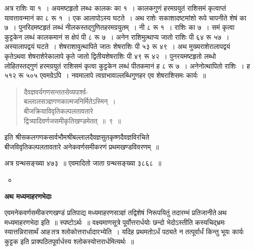 \documentclass[11pt, openany]{book}
\begin{document}
 अत्र राशिः या १~। अयमष्टहृतो लब्धः कालकः का १~। कालकगुणं हरमग्रयुतं राशिसमं कृत्वाप्तं यावत्तावन्मानं का ८ रू १~। एक आलापोऽस्य घटते~। अथ राशेः सकाशादष्टमांशो रूपे चापनीते शेषं का ७~। पुनरिदमष्टहृतं लब्धं नीलकस्तद्गुणितहरमग्रयुतम्~। नी ८ 
रू १~। राशिः का ७~। समं कृत्वा कुट्टकेन लब्धं कालकमानं स क्षेपं 
पी ८ रू ७~। अनेन राशिमुत्थाप्य जातो राशिः पी ६४ रू ५७~। 
अस्यालापद्वयं घटते~। शेषराशावुत्थापिते जातः शेषराशिः पी ५३ 
रू ४९~। अथ मुख्यराशेरालापद्वयं कृतेऽथवा शेषराशेरेकालापे कृते जातो 
द्वितीयशेषराशिः पी ४९ रू ४२~। पुनरयमष्टहृतो लब्धो लोहितस्तद्गुणं 
हरमग्रयुतं राशिसमं कृत्वा कुट्टकेन लब्धं पीतकमानं ह ८ रू ७~। 
अनेनोत्थापितो राशिः~। ह ५१२ रू ५०५ एवमग्रेऽपि~। नवमालापे त्वग्राभावाल्लब्धिगुणहर एव शेषराशिसमः कार्यः~॥ 
\begin{quote}
    \qt
     दैवज्ञवर्यगणसन्ततसेव्यपार्श्व- \\

\vspace{-7mm}
\hspace{1cm} बल्लालसञ्ज्ञगणकात्मजनिर्मितेऽस्मिन्~। \\

\vspace{-7mm}
 बीजक्रियाविवृतिकल्पलतावतारे \\

\vspace{-7mm}
\hspace{1cm} द्वित्र्यादिवर्णजसमीकृतिखण्डमेतत्~॥~९~॥~
\end{quote}

\begin{center}
इति श्रीसकलगणकसार्वभौमश्रीबल्लालदैवज्ञसुतकृष्णदैवज्ञविरचिते \\
 बीजविवृतिकल्पलतावतारे अनेकवर्णसमीकरणं प्रथमखण्डविवरणम्~॥ 
\end{center}

 अत्र ग्रन्थसङ्ख्या ४७३~॥ एवमादितो जाता ग्रन्थसङ्ख्या ३८६८~॥

\begin{center}
     \textendash\textendash~० \textendash\textendash
\end{center}
\newpage
 \label{bheda}
\begin{center}
    \textbf{\LARGE अथ मध्यमाहरणभेदाः }
\end{center}
 
 \vspace{2mm}
 एवमनेकवर्णसमीकरणखण्डं प्रतिपाद्य मध्यमाहरणसञ्ज्ञं तद्विशेषं 
निरूपयितुं तदारम्भं प्रतिजानीते\textendash \,अथ मध्यमाहरणभेदा इति~॥ स्पष्टोऽर्थः~॥ वक्ष्यमाणसूत्रे पूर्वोत्तरार्धयोः छन्दो भेदोऽस्तीति कस्यचिद्भ्रमः स्यात्तन्निरासार्थं आह\textendash \,तत्र श्लोकोत्तरार्धादारभ्येति~। यदिह प्रथमतोऽर्धं पठ्यते न तत्पूर्वार्धं किन्तु भूयः कार्यः कुट्टक इति प्राक्पठितपूर्वार्धस्य
श्लोकस्योत्तरार्धमित्यर्थः~॥ \\
\end{document}

